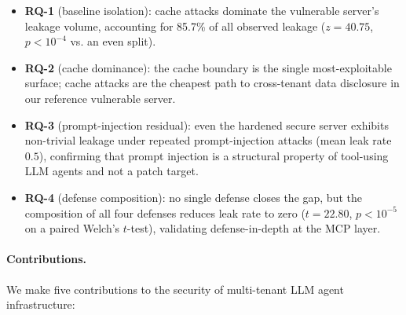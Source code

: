 \begin{itemize}
  \item \textbf{RQ-1} (baseline isolation): cache attacks dominate
        the vulnerable server's leakage volume, accounting for
        85.7\% of all observed leakage ($z = 40.75$, $p < 10^{-4}$
        vs. an even split).
  \item \textbf{RQ-2} (cache dominance): the cache boundary is the
        single most-exploitable surface; cache attacks are the
        cheapest path to cross-tenant data disclosure in our
        reference vulnerable server.
  \item \textbf{RQ-3} (prompt-injection residual): even the
        hardened secure server exhibits non-trivial leakage under
        repeated prompt-injection attacks (mean leak rate
        $0.5$), confirming that prompt injection is a structural
        property of tool-using LLM agents and not a patch
        target.
  \item \textbf{RQ-4} (defense composition): no single defense
        closes the gap, but the composition of all four defenses
        reduces leak rate to zero ($t = 22.80$, $p < 10^{-5}$ on
        a paired Welch's $t$-test), validating defense-in-depth
        at the MCP layer.
\end{itemize}

\paragraph{Contributions.}
We make five contributions to the security of multi-tenant LLM
agent infrastructure:

